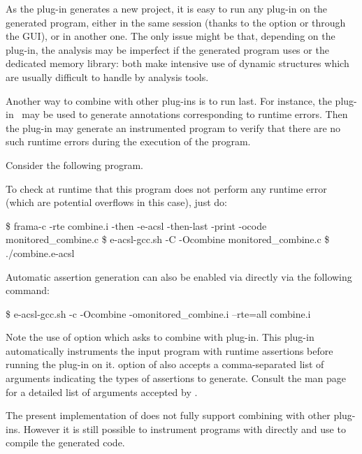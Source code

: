 As the \eacsl plug-in generates a new \framac project, it is easy to run any
plug-in on the generated program, either in the same \framac session (thanks to
the option  or through the GUI), or in another one. The only
issue might be that, depending on the plug-in, the analysis may be imperfect if
the generated program uses \gmp or the dedicated memory library: both make
intensive use of dynamic structures which are usually difficult to handle by
analysis tools.

Another way to combine \eacsl with other plug-ins is to run \eacsl last.  For
instance, the \rte plug-in~\cite{rte} may be used to generate annotations
corresponding to runtime errors. Then the \eacsl plug-in may generate an
instrumented program to verify that there are no such runtime errors during the
execution of the program.

Consider the following program.

To check at runtime that this program does not perform any runtime error (which
are potential overflows in this case), just do:

\begin{shell}
\$ frama-c -rte combine.i -then -e-acsl -then-last -print
  -ocode monitored_combine.c
\$ e-acsl-gcc.sh -C -Ocombine monitored_combine.c
\$ ./combine.e-acsl
\end{shell}

Automatic assertion generation can also be enabled via \eacslgcc directly via
the following command:
\begin{shell}
\$ e-acsl-gcc.sh -c -Ocombine -omonitored_combine.i --rte=all combine.i
\end{shell}

Note the use of \eacslgcc {} option which asks \framac to combine
\eacsl with \rte plug-in. This plug-in automatically instruments the input
program with runtime
assertions before running the \eacsl plug-in on it.   option of
\eacslgcc also accepts a comma-separated list of arguments indicating the types
of assertions to generate. Consult the \eacslgcc man page for a detailed
list of arguments accepted by .

The present implementation of \eacslgcc does not fully support combining \eacsl
with other \framac plug-ins. However it is still possible to instrument programs
with \eacsl directly and use \eacslgcc to compile the generated code.

